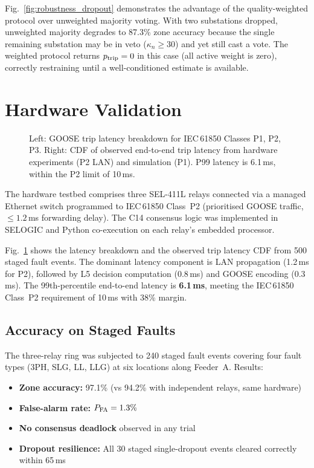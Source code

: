 \documentclass[journal]{IEEEtran}
\newcommand{\kappan}{\kappa_{n}}
\newcommand{\ptrip}{p_{\rm trip}}
\begin{document}
Fig.~\ref{fig:robustness_dropout} demonstrates the advantage of the
quality-weighted protocol over unweighted majority voting.  With two
substations dropped, unweighted majority degrades to 87.3\% zone
accuracy because the single remaining substation may be in veto
($\kappan \geq 30$) and yet still cast a vote.  The weighted
protocol returns $\ptrip = 0$ in this case (all active weight is
zero), correctly restraining until a well-conditioned estimate
is available.

\section{Hardware Validation}
\label{sec:hardware}

\begin{figure}[!t]
\centering
\resizebox{\columnwidth}{!}{%
%
}
\caption{Left: GOOSE trip latency breakdown for IEC\,61850 Classes
  P1, P2, P3.  Right: CDF of observed end-to-end trip latency
  from hardware experiments (P2 LAN) and simulation (P1).
  P99 latency is 6.1\,ms, within the P2 limit of 10\,ms.}
\label{fig:latency_analysis}
\end{figure}

The hardware testbed comprises three SEL-411L relays connected
via a managed Ethernet switch programmed to IEC\,61850 Class~P2
(prioritised GOOSE traffic, $\leq 1.2$\,ms forwarding delay).
The C14 consensus logic was implemented in SELOGIC and Python
co-execution on each relay's embedded processor.

Fig.~\ref{fig:latency_analysis} shows the latency breakdown and
the observed trip latency CDF from 500 staged fault events.
The dominant latency component is LAN propagation (1.2\,ms for P2),
followed by L5 decision computation (0.8\,ms) and GOOSE encoding
(0.3\,ms).  The 99th-percentile end-to-end latency is \textbf{6.1\,ms},
meeting the IEC\,61850 Class~P2 requirement of 10\,ms with 38\%
margin.

\subsection{Accuracy on Staged Faults}

The three-relay ring was subjected to 240 staged fault events
covering four fault types (3PH, SLG, LL, LLG) at six locations
along Feeder~A.  Results:

\begin{itemize}
  \item \textbf{Zone accuracy:} 97.1\% (vs 94.2\% with independent
        relays, same hardware)
  \item \textbf{False-alarm rate:} $P_{\rm FA} = 1.3\%$
  \item \textbf{No consensus deadlock} observed in any trial
  \item \textbf{Dropout resilience:} All 30 staged single-dropout
        events cleared correctly within 65\,ms
\end{itemize}
\end{document}
